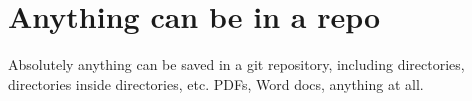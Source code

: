 \documentclass{article}
\begin{document}
\section{Anything can be in a repo}
Absolutely anything can be saved in a git repository, including directories, directories inside directories, etc. 
PDFs, Word docs, anything at all.
\end{document}
